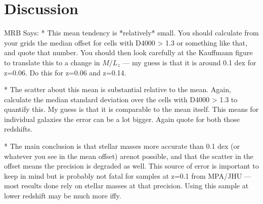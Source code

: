 \section{Discussion}

MRB Says: * This mean tendency is *relatively* small. You should calculate from your grids the median offset for cells with D4000 > 1.3 or something like that, and quote that number. You should then look carefully at the Kauffmann figure to translate this to a change in $M/L_z$ --- my guess is that it is around 0.1 dex for z=0.06. Do this for z=0.06 and z=0.14.

 * The scatter about this mean is substantial relative to the mean. Again, calculate the median standard deviation over the cells with D4000 > 1.3 to quantify this. My guess is that it is  comparable to the mean itself. This means for individual galaxies the error can be a lot bigger. Again quote for both those redshifts.

 * The main conclusion is that stellar masses more accurate than 0.1 dex (or whatever you see in the mean offset) arenot possible, and that the scatter in the offset means the precision is degraded as well. This source of error is important
to keep in mind but is probably not fatal for samples at z=0.1
from MPA/JHU --- most results done rely on stellar masses
at that precision. Using this sample at lower redshift may be
much more iffy.








